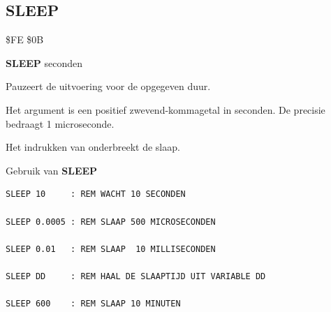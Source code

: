 \subsection{SLEEP}
\begin{description}[leftmargin=2cm,style=nextline]
\item [Token:]    \$FE \$0B

\item [Formaat:]   {\bf SLEEP} seconden

\item [Gebruik:]    Pauzeert de uitvoering voor de opgegeven duur.

                  Het argument is een positief zwevend-kommagetal in seconden. De precisie bedraagt 1 microseconde.

\item [Opmerkingen:]  Het indrukken van  onderbreekt de slaap.

\item [Voorbeelden:] Gebruik van {\bf SLEEP}

\begin{tcolorbox}[colback=black,coltext=white]
\verbatimfont{\codefont}
\begin{verbatim}
SLEEP 10     : REM WACHT 10 SECONDEN

SLEEP 0.0005 : REM SLAAP 500 MICROSECONDEN

SLEEP 0.01   : REM SLAAP  10 MILLISECONDEN

SLEEP DD     : REM HAAL DE SLAAPTIJD UIT VARIABLE DD

SLEEP 600    : REM SLAAP 10 MINUTEN
\end{verbatim}
\end{tcolorbox}
\end{description}


\newpage
